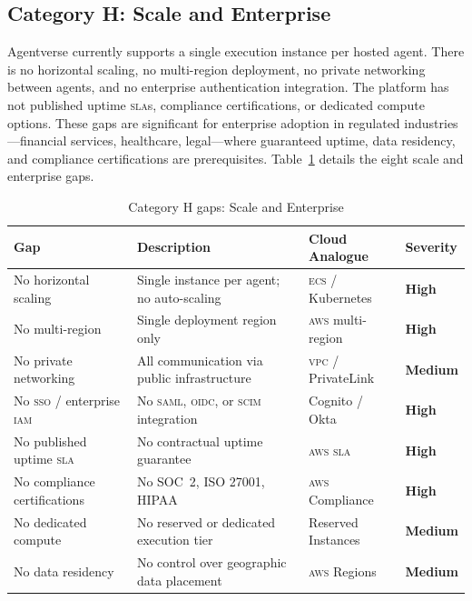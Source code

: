 \documentclass[twoside,11pt]{article}
\newcommand{\high}{\textcolor{red!70!black}{\textbf{High}}}
\newcommand{\medium}{\textcolor{orange!80!black}{\textbf{Medium}}}
\begin{document}
\subsection{Category H: Scale and Enterprise}
\label{subsec:gap-enterprise}

Agentverse currently supports a single execution instance per hosted agent.
There is no horizontal scaling, no multi-region deployment, no private
networking between agents, and no enterprise authentication integration.  The
platform has not published uptime \textsc{sla}s, compliance certifications, or
dedicated compute options.  These gaps are significant for enterprise adoption
in regulated industries---financial services, healthcare, legal---where
guaranteed uptime, data residency, and compliance certifications are
prerequisites.  Table~\ref{tab:gap-enterprise} details the eight scale and
enterprise gaps.

\begin{table}[htbp]
\centering
\caption{Category H gaps: Scale and Enterprise}
\label{tab:gap-enterprise}
\begin{tabular}{>{\raggedright\arraybackslash}p{3.2cm} >{\raggedright\arraybackslash}p{5.5cm} >{\raggedright\arraybackslash}p{2.9cm} l}
\toprule
\textbf{Gap} & \textbf{Description} & \textbf{Cloud Analogue} &
\textbf{Severity} \\
\midrule
No horizontal scaling & Single instance per agent; no auto-scaling &
\textsc{ecs} / Kubernetes & \high \\
No multi-region & Single deployment region only & \textsc{aws} multi-region &
\high \\
No private networking & All communication via public infrastructure & \textsc{vpc}
/ PrivateLink & \medium \\
No \textsc{sso} / enterprise \textsc{iam} & No \textsc{saml}, \textsc{oidc}, or
\textsc{scim} integration & Cognito / Okta & \high \\
No published uptime \textsc{sla} & No contractual uptime guarantee & \textsc{aws sla} &
\high \\
No compliance certifications & No SOC~2, ISO 27001, HIPAA & \textsc{aws}
Compliance & \high \\
No dedicated compute & No reserved or dedicated execution tier & Reserved
Instances & \medium \\
No data residency & No control over geographic data placement & \textsc{aws}
Regions & \medium \\
\bottomrule
\end{tabular}
\end{table}
\end{document}
